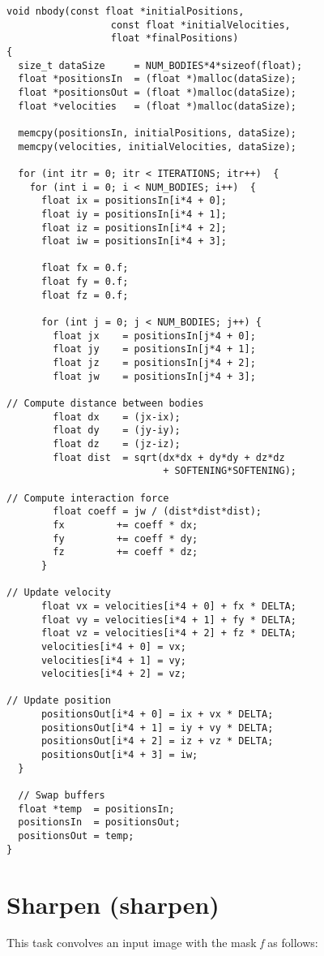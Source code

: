 \documentclass[]{report}
\begin{document}
\begin{lstlisting}[frame=single]  
void nbody(const float *initialPositions,
                  const float *initialVelocities,
                  float *finalPositions) 
{
  size_t dataSize     = NUM_BODIES*4*sizeof(float);
  float *positionsIn  = (float *)malloc(dataSize);
  float *positionsOut = (float *)malloc(dataSize);
  float *velocities   = (float *)malloc(dataSize);

  memcpy(positionsIn, initialPositions, dataSize);
  memcpy(velocities, initialVelocities, dataSize);

  for (int itr = 0; itr < ITERATIONS; itr++)  {
    for (int i = 0; i < NUM_BODIES; i++)  {
      float ix = positionsIn[i*4 + 0];
      float iy = positionsIn[i*4 + 1];
      float iz = positionsIn[i*4 + 2];
      float iw = positionsIn[i*4 + 3];

      float fx = 0.f;
      float fy = 0.f;
      float fz = 0.f;

      for (int j = 0; j < NUM_BODIES; j++) {
        float jx    = positionsIn[j*4 + 0];
        float jy    = positionsIn[j*4 + 1];
        float jz    = positionsIn[j*4 + 2];
        float jw    = positionsIn[j*4 + 3];

// Compute distance between bodies
        float dx    = (jx-ix);
        float dy    = (jy-iy);
        float dz    = (jz-iz);
        float dist  = sqrt(dx*dx + dy*dy + dz*dz 
                           + SOFTENING*SOFTENING);

// Compute interaction force
        float coeff = jw / (dist*dist*dist);
        fx         += coeff * dx;
        fy         += coeff * dy;
        fz         += coeff * dz;
      }

// Update velocity
      float vx = velocities[i*4 + 0] + fx * DELTA;
      float vy = velocities[i*4 + 1] + fy * DELTA;
      float vz = velocities[i*4 + 2] + fz * DELTA;
      velocities[i*4 + 0] = vx;
      velocities[i*4 + 1] = vy;
      velocities[i*4 + 2] = vz;

// Update position
      positionsOut[i*4 + 0] = ix + vx * DELTA;
      positionsOut[i*4 + 1] = iy + vy * DELTA;
      positionsOut[i*4 + 2] = iz + vz * DELTA;
      positionsOut[i*4 + 3] = iw;
  }

  // Swap buffers
  float *temp  = positionsIn;
  positionsIn  = positionsOut;
  positionsOut = temp;
}
\end{lstlisting} 


\section{Sharpen (sharpen)}
This task convolves an input image with the mask \textit{f} as follows:
\end{document}
